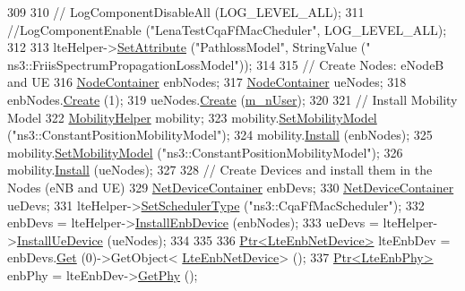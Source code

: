 \begin{DoxyCode}
309 
310 \textcolor{comment}{//   LogComponentDisableAll (LOG\_LEVEL\_ALL);}
311   \textcolor{comment}{//LogComponentEnable ("LenaTestCqaFfMacCheduler", LOG\_LEVEL\_ALL);}
312    
313   lteHelper->\hyperlink{classns3_1_1ObjectBase_ac60245d3ea4123bbc9b1d391f1f6592f}{SetAttribute} (\textcolor{stringliteral}{"PathlossModel"}, StringValue (\textcolor{stringliteral}{"
      ns3::FriisSpectrumPropagationLossModel"}));
314 
315   \textcolor{comment}{// Create Nodes: eNodeB and UE}
316   \hyperlink{classns3_1_1NodeContainer}{NodeContainer} enbNodes;
317   \hyperlink{classns3_1_1NodeContainer}{NodeContainer} ueNodes;
318   enbNodes.\hyperlink{classns3_1_1NodeContainer_a787f059e2813e8b951cc6914d11dfe69}{Create} (1);
319   ueNodes.\hyperlink{classns3_1_1NodeContainer_a787f059e2813e8b951cc6914d11dfe69}{Create} (\hyperlink{classLenaCqaFfMacSchedulerTestCase1_a30de491612daf3ae61a52937b2aa0cc8}{m\_nUser});
320 
321   \textcolor{comment}{// Install Mobility Model}
322   \hyperlink{classns3_1_1MobilityHelper}{MobilityHelper} mobility;
323   mobility.\hyperlink{classns3_1_1MobilityHelper_a030275011b6f40682e70534d30280aba}{SetMobilityModel} (\textcolor{stringliteral}{"ns3::ConstantPositionMobilityModel"});
324   mobility.\hyperlink{classns3_1_1MobilityHelper_a07737960ee95c0777109cf2994dd97ae}{Install} (enbNodes);
325   mobility.\hyperlink{classns3_1_1MobilityHelper_a030275011b6f40682e70534d30280aba}{SetMobilityModel} (\textcolor{stringliteral}{"ns3::ConstantPositionMobilityModel"});
326   mobility.\hyperlink{classns3_1_1MobilityHelper_a07737960ee95c0777109cf2994dd97ae}{Install} (ueNodes);
327 
328   \textcolor{comment}{// Create Devices and install them in the Nodes (eNB and UE)}
329   \hyperlink{classns3_1_1NetDeviceContainer}{NetDeviceContainer} enbDevs;
330   \hyperlink{classns3_1_1NetDeviceContainer}{NetDeviceContainer} ueDevs;
331   lteHelper->\hyperlink{classns3_1_1LteHelper_a8f86e55b8b80a81732c4b2df00fb25d5}{SetSchedulerType} (\textcolor{stringliteral}{"ns3::CqaFfMacScheduler"});
332   enbDevs = lteHelper->\hyperlink{classns3_1_1LteHelper_a5e009ad35ef85f46b5a6099263f15a03}{InstallEnbDevice} (enbNodes);
333   ueDevs = lteHelper->\hyperlink{classns3_1_1LteHelper_ac9cd932d7de92811cfa953c2e3b2fc9f}{InstallUeDevice} (ueNodes);
334 
335 
336   \hyperlink{classns3_1_1Ptr}{Ptr<LteEnbNetDevice>} lteEnbDev = enbDevs.\hyperlink{classns3_1_1NetDeviceContainer_a677d62594b5c9d2dea155cc5045f4d0b}{Get} (0)->GetObject<
      \hyperlink{classns3_1_1LteEnbNetDevice}{LteEnbNetDevice}> ();
337   \hyperlink{classns3_1_1Ptr}{Ptr<LteEnbPhy>} enbPhy = lteEnbDev->\hyperlink{classns3_1_1LteEnbNetDevice_a58db72130e0740f16a5e03b22e4a10a4}{GetPhy} ();

\end{DoxyCode}
